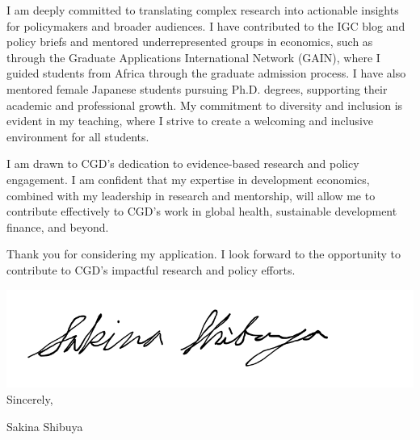 \documentclass[12pt]{letter}
\begin{document}
I am deeply committed to translating complex research into actionable insights for policymakers and broader audiences. 
I have contributed to the IGC blog and policy briefs and mentored underrepresented groups in economics, such as through 
the Graduate Applications International Network (GAIN), where I guided students from Africa through the graduate admission 
process. I have also mentored female Japanese students pursuing Ph.D. degrees, supporting their academic and professional 
growth. My commitment to diversity and inclusion is evident in my teaching, where I strive to create a welcoming and 
inclusive environment for all students.

I am drawn to CGD's dedication to evidence-based research and policy engagement. I am confident that my expertise 
in development economics, combined with my leadership in research and mentorship, will allow me to contribute effectively 
to CGD's work in global health, sustainable development finance, and beyond.

Thank you for considering my application. I look forward to the opportunity to contribute to CGD's 
impactful research and policy efforts.

\bigskip

\includegraphics[height=4\baselineskip]{signature.png}  \\

\vspace*{-6.5\baselineskip}Sincerely, 

\vspace{2.5\baselineskip}Sakina Shibuya
\end{document}
